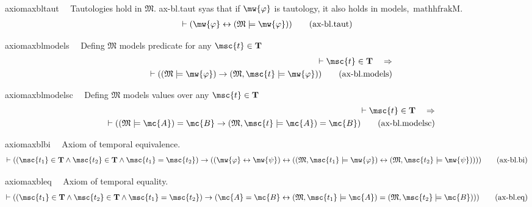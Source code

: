 \begin{restatable}{axiom}{axbltaut}~~ Tautologies hold in $\mathfrak{M}$.
   ax-bl.taut syas that if $\mw{\varphi}$ is tautology, it also holds in
models, $\,\mathrm{mathhfrakM}$.
\begin{align}
\vdash ( \mw{\varphi} \leftrightarrow ( \mathfrak{M} \models \mw{\varphi} )
    )\label{eq:ax-bl.taut}\tag{ax-bl.taut}
\end{align}
\end{restatable}

\begin{restatable}{axiom}{axblmodels}~~ Defing $\mathfrak{M}$ models predicate
for any $\msc{t} \in \mathbf{T}$
\begin{align}
\vdash \msc{t} \in \mathbf{T}\quad\Rightarrow \notag \\ 
	\quad \vdash ( ( \mathfrak{M}
    \models \mw{\varphi} ) \rightarrow ( \mathfrak{M} , \msc{t} \models
    \mw{\varphi} ) )\label{eq:ax-bl.models}\tag{ax-bl.models}
\end{align}
\end{restatable}

\begin{restatable}{axiom}{axblmodelsc}~~ Defing $\mathfrak{M}$ models values
over any $\msc{t} \in \mathbf{T}$
\begin{align}
\vdash \msc{t} \in \mathbf{T}\quad\Rightarrow \notag \\ 
	\quad \vdash ( ( \mathfrak{M}
    \models \mc{A} ) = \mc{B} \rightarrow ( \mathfrak{M} , \msc{t} \models
    \mc{A} ) = \mc{B} )\label{eq:ax-bl.modelsc}\tag{ax-bl.modelsc}
\end{align}
\end{restatable}

\begin{restatable}{axiom}{axblbi}~~ Axiom of temporal equivalence.
\begin{align}
\vdash ( ( \msc{t_1} \in \mathbf{T} \wedge \msc{t_2} \in \mathbf{T} \wedge
    \msc{t_1} = \msc{t_2} ) \rightarrow ( ( \mw{\varphi} \leftrightarrow
    \mw{\psi} ) \leftrightarrow ( ( \mathfrak{M} , \msc{t_1} \models
    \mw{\varphi} ) \leftrightarrow ( \mathfrak{M} , \msc{t_2} \models \mw{\psi}
    ) ) ) )\label{eq:ax-bl.bi}\tag{ax-bl.bi}
\end{align}
\end{restatable}

\begin{restatable}{axiom}{axbleq}~~ Axiom of temporal equality.
\begin{align}
\vdash ( ( \msc{t_1} \in \mathbf{T} \wedge \msc{t_2} \in \mathbf{T} \wedge
    \msc{t_1} = \msc{t_2} ) \rightarrow ( \mc{A} = \mc{B} \leftrightarrow (
    \mathfrak{M} , \msc{t_1} \models \mc{A} ) = ( \mathfrak{M} , \msc{t_2}
    \models \mc{B} ) ) )\label{eq:ax-bl.eq}\tag{ax-bl.eq}
\end{align}
\end{restatable}

